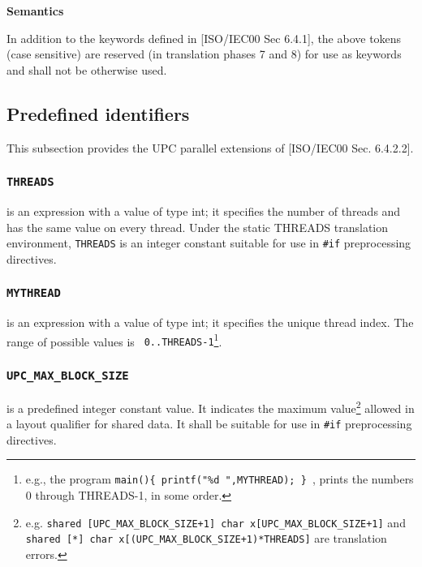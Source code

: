 {\bf Semantics}

\np In addition to the keywords defined in [ISO/IEC00 Sec 6.4.1], the above
tokens (case sensitive) are reserved (in translation phases 7 and 8) for use
as keywords and shall not be otherwise used.

 
\subsection{Predefined identifiers}

\npf This subsection provides the UPC parallel extensions of
    [ISO/IEC00 Sec. 6.4.2.2].

\subsubsection{{\tt THREADS}}
\label{threads}
 is an expression with a value of type int; it specifies the number of
     threads and has the same value on every
     thread.   Under the static THREADS translation environment, {\tt THREADS}
     is an integer constant suitable for use in {\tt \#if} preprocessing directives.

\subsubsection{{\tt MYTHREAD}}
 is an expression with a value of type int; it specifies the
     unique thread index.%
     The range of possible values is {\tt
     0..THREADS-1}\footnote{e.g., the program {\tt main()\{
     printf("\%d ",MYTHREAD); \} }, prints the numbers 0 through
     THREADS-1, in some order.}.

\subsubsection{{\tt UPC\_MAX\_BLOCK\_SIZE}}
\label{max_block_size}
 is a predefined integer
     constant value.  It indicates the maximum value\footnote{
     e.g. {\tt shared [UPC\_MAX\_BLOCK\_SIZE+1] char
     x[UPC\_MAX\_BLOCK\_SIZE+1]} and {\tt shared [*] char
     x[(UPC\_MAX\_BLOCK\_SIZE+1)*THREADS]} are translation errors.} allowed
     in a layout qualifier for shared data.  It shall be suitable for use in 
     {\tt \#if} preprocessing directives.

